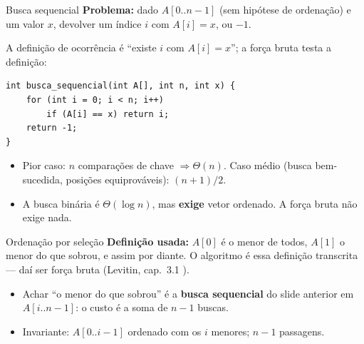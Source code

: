 \documentclass[aspectratio=169]{beamer}
\begin{document}
\begin{frame}[fragile]{Busca sequencial}
  \textbf{Problema:} dado $A[0..n-1]$ (sem hipótese de ordenação) e um valor $x$,
  devolver um índice $i$ com $A[i] = x$, ou $-1$.

  \smallskip
  A definição de ocorrência é ``existe $i$ com $A[i]=x$''; a força bruta testa a definição:

\begin{lstlisting}
int busca_sequencial(int A[], int n, int x) {
    for (int i = 0; i < n; i++)
        if (A[i] == x) return i;
    return -1;
}
\end{lstlisting}

  \begin{itemize}
    \item Pior caso: $n$ comparações de chave $\Rightarrow \Theta(n)$.
      Caso médio (busca bem-sucedida, posições equiprováveis): $(n+1)/2$.
    \item A busca binária é $\Theta(\log n)$, mas \textbf{exige} vetor ordenado.
      A força bruta não exige nada.
  \end{itemize}
\end{frame}

\begin{frame}{Ordenação por seleção}
  \textbf{Definição usada:} $A[0]$ é o menor de todos, $A[1]$ o menor do que
  sobrou, e assim por diante. O algoritmo é essa definição transcrita --- daí
  ser força bruta (Levitin, cap.\ 3.1 \cite{levitin2012introduction}).

  \begin{center}
  \end{center}

  \begin{itemize}
    \item Achar ``o menor do que sobrou'' é a \textbf{busca sequencial} do slide
      anterior em $A[i..n-1]$: o custo é a soma de $n-1$ buscas.
    \item Invariante: $A[0..i-1]$ ordenado com os $i$ menores; $n-1$ passagens.
  \end{itemize}
\end{frame}
\end{document}
